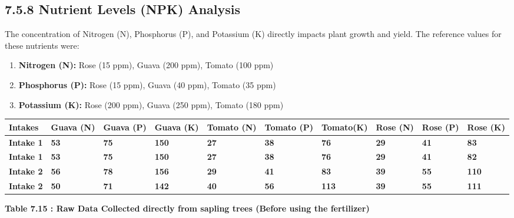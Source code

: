\documentclass{book} %
\begin{document}
\noindent 
\subsection{7.5.8 Nutrient Levels (NPK) Analysis}

\noindent The concentration of Nitrogen (N), Phosphorus (P), and Potassium (K) directly impacts plant growth and yield. The reference values for these nutrients were:

\begin{enumerate}
\item  \textbf{Nitrogen (N):} Rose (15 ppm), Guava (200 ppm), Tomato (100 ppm)

\item  \textbf{Phosphorus (P):} Rose (15 ppm), Guava (40 ppm), Tomato (35 ppm)

\item  \textbf{Potassium (K):} Rose (200 ppm), Guava (250 ppm), Tomato (180 ppm)
\end{enumerate}

\textbf{}

\begin{tabular}{|p{0.4in}|p{0.4in}|p{0.5in}|p{0.4in}|p{0.4in}|p{0.4in}|p{0.4in}|p{0.4in}|p{0.4in}|p{0.4in}|} \hline 
\textbf{Intakes} & \textbf{Guava (N)} & \textbf{Guava (P)} & \textbf{Guava (K)} & \textbf{Tomato (N)} & \textbf{Tomato (P)} & \textbf{Tomato\newline (K)} & \textbf{Rose (N)} & \textbf{Rose (P)} & \textbf{Rose (K)} \\ \hline 
\textbf{Intake 1} & \textbf{53} & \textbf{75} & \textbf{150} & \textbf{27} & \textbf{38} & \textbf{76} & \textbf{29} & \textbf{41} & \textbf{83} \\ \hline 
\textbf{Intake 1} & \textbf{53} & \textbf{75} & \textbf{150} & \textbf{27} & \textbf{38} & \textbf{76} & \textbf{29} & \textbf{41} & \textbf{82} \\ \hline 
\textbf{Intake 2} & \textbf{56} & \textbf{78} & \textbf{156} & \textbf{29} & \textbf{41} & \textbf{83} & \textbf{39} & \textbf{55} & \textbf{110} \\ \hline 
\textbf{Intake 2} & \textbf{50} & \textbf{71} & \textbf{142} & \textbf{40} & \textbf{56} & \textbf{113} & \textbf{39} & \textbf{55} & \textbf{111} \\ \hline 
\end{tabular}

\textbf{Table 7.15 : Raw Data Collected directly from sapling trees (Before using the fertilizer)}
\end{document}
